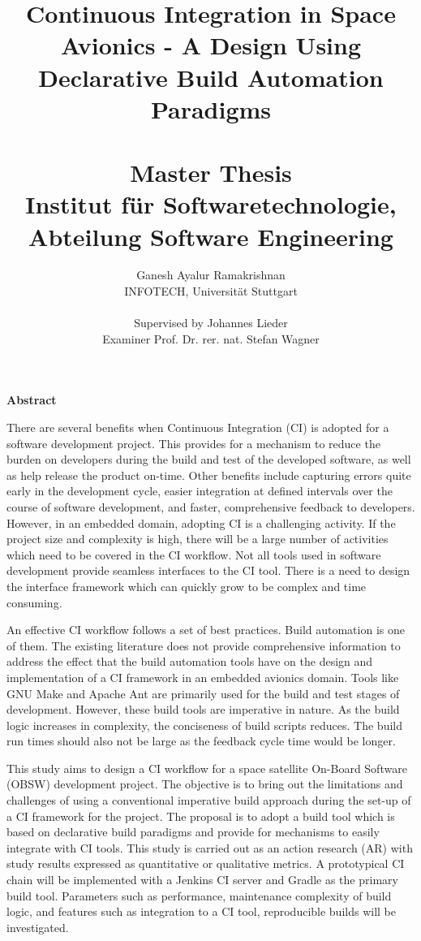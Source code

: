 \documentclass[12pt, a4paper, titlepage]{scrartcl}
\title{Continuous Integration in Space Avionics - A Design Using Declarative Build Automation Paradigms\\
\ \\
{\large Master Thesis \\
	Institut für Softwaretechnologie, \\
	Abteilung Software Engineering
\\
}
}
\author{Ganesh Ayalur Ramakrishnan  \\
  INFOTECH, Universität Stuttgart  \\
  \\
  Supervised by Johannes Lieder \\
  Examiner Prof. Dr. rer. nat. Stefan Wagner
}
\newcommand\blankpage{%
    \null
    \thispagestyle{empty}%
    \newpage}
\begin{document}
\afterpage{\blankpage}
\maketitle

\afterpage{\blankpage}
\textbf{Abstract}
\par There are several benefits when Continuous Integration (CI) is adopted for a software
development project. This provides for a mechanism to reduce the burden on developers during the build and test of the developed software, as well as help release the product on-time.
Other benefits include capturing errors quite early in the development cycle, easier integration
at defined intervals over the course of software development, and faster, comprehensive
feedback to developers. However, in an embedded domain, adopting CI is a challenging activity. If the project size and complexity is high, there will be a large number of activities which need to be covered in the CI workflow. Not all tools used in software development provide seamless interfaces to the CI tool. There is a need to design the interface framework which can quickly grow to be complex and time consuming. 
\par An effective CI workflow follows a set of best practices. Build automation is one of them. The existing literature does not provide comprehensive information to address the effect that the build
automation tools have on the design and implementation of a CI framework in an embedded
avionics domain. Tools like GNU Make and Apache Ant are primarily used for the build and
test stages of development. However, these build tools are imperative in nature. As the build logic increases in complexity, the conciseness of build scripts reduces. The build run times should also not be large as the feedback cycle time would be longer. 
\par This study aims to design a CI workflow for a space satellite On-Board Software (OBSW) development
project. The objective is to bring out the limitations and challenges of using a conventional imperative
build approach during the set-up of a CI framework for the project. The proposal
is to adopt a build tool which is based on declarative build paradigms and provide
for mechanisms to easily integrate with CI tools. This study is carried out as an action research
(AR) with study results expressed as quantitative or qualitative metrics. A prototypical CI chain will be implemented
with a Jenkins CI server and Gradle as the primary build tool. Parameters such as performance, maintenance complexity of build logic, and features such as integration to a CI tool, reproducible builds will be investigated. 
\end{document}
